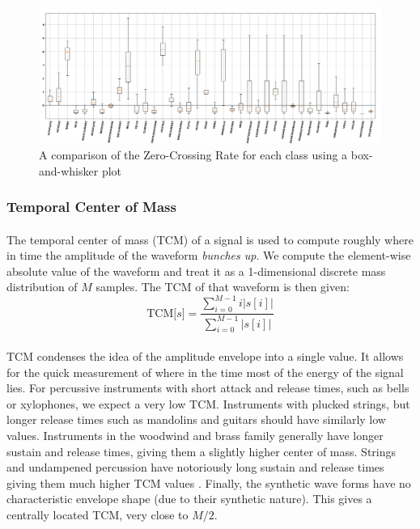 \documentclass[12pt,letterpaper]{article}
\begin{document}
\begin{figure}[H]
\begin{center}
\includegraphics[scale=0.3]{../FiguresFeatures/Zero_X-Rate}
\end{center}
\caption{A comparison of the Zero-Crossing Rate for each class using a box-and-whisker plot}
\label{fig-FeatureZXR}
\end{figure}


\subsubsection{Temporal Center of Mass}

\paragraph*{}The temporal center of mass (TCM) of a signal is used to compute roughly where in time the amplitude of the waveform \textit{bunches up}. We compute the element-wise absolute value of the waveform and treat it as a 1-dimensional discrete mass distribution of $M$ samples.
The TCM of that waveform is then given:
\begin{equation}
\label{eqn-FeatureTCM}
\text{TCM}\big[ s \big] = \frac{\sum_{i=0}^{M-1}i \big|s[i]\big|}
{\sum_{i=0}^{M-1}\big|s[i]\big|}
\end{equation}

\paragraph*{}TCM condenses the idea of the amplitude envelope into a single value. It allows for the quick measurement of where in the time most of the energy of the signal lies. For percussive instruments with short attack and release times, such as bells or xylophones, we expect a very low TCM. Instruments with plucked strings, but longer release times such as mandolins and guitars should have similarly low values. Instruments in the woodwind and brass family generally have longer sustain and release times, giving them a slightly higher center of mass. Strings and undampened percussion have notoriously long sustain and release times giving them much higher TCM values \cite{Olson,White}. Finally, the synthetic wave forms have no characteristic  envelope shape (due to their synthetic nature). This gives a centrally located TCM, very close to $M/2$.
\end{document}
